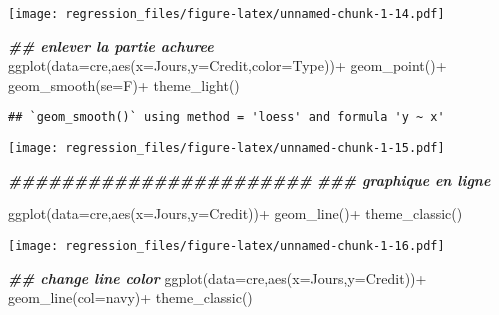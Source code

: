 \documentclass[
]{article}
\newenvironment{Shaded}{\begin{snugshade}}{\end{snugshade}}
\newcommand{\AttributeTok}[1]{\textcolor[rgb]{0.77,0.63,0.00}{#1}}
\newcommand{\DocumentationTok}[1]{\textcolor[rgb]{0.56,0.35,0.01}{\textbf{\textit{#1}}}}
\newcommand{\FunctionTok}[1]{\textcolor[rgb]{0.00,0.00,0.00}{#1}}
\newcommand{\NormalTok}[1]{#1}
\newcommand{\SpecialCharTok}[1]{\textcolor[rgb]{0.00,0.00,0.00}{#1}}
\newcommand{\StringTok}[1]{\textcolor[rgb]{0.31,0.60,0.02}{#1}}
\begin{document}
\texttt{[image: regression\_files/figure-latex/unnamed-chunk-1-14.pdf]}

\begin{Shaded}
\begin{Highlighting}[]
\DocumentationTok{\#\# enlever la partie achuree}
\FunctionTok{ggplot}\NormalTok{(}\AttributeTok{data=}\NormalTok{cre,}\FunctionTok{aes}\NormalTok{(}\AttributeTok{x=}\NormalTok{Jours,}\AttributeTok{y=}\NormalTok{Credit,}\AttributeTok{color=}\NormalTok{Type))}\SpecialCharTok{+}
  \FunctionTok{geom\_point}\NormalTok{()}\SpecialCharTok{+}
  \FunctionTok{geom\_smooth}\NormalTok{(}\AttributeTok{se=}\NormalTok{F)}\SpecialCharTok{+}
  \FunctionTok{theme\_light}\NormalTok{()}
\end{Highlighting}
\end{Shaded}

\begin{verbatim}
## `geom_smooth()` using method = 'loess' and formula 'y ~ x'
\end{verbatim}

\texttt{[image: regression\_files/figure-latex/unnamed-chunk-1-15.pdf]}

\begin{Shaded}
\begin{Highlighting}[]
\DocumentationTok{\#\#\#\#\#\#\#\#\#\#\#\#\#\#\#\#\#\#\#\#\#\#\#}
\DocumentationTok{\#\#\# graphique en ligne}

\FunctionTok{ggplot}\NormalTok{(}\AttributeTok{data=}\NormalTok{cre,}\FunctionTok{aes}\NormalTok{(}\AttributeTok{x=}\NormalTok{Jours,}\AttributeTok{y=}\NormalTok{Credit))}\SpecialCharTok{+}
  \FunctionTok{geom\_line}\NormalTok{()}\SpecialCharTok{+}
  \FunctionTok{theme\_classic}\NormalTok{()}
\end{Highlighting}
\end{Shaded}

\texttt{[image: regression\_files/figure-latex/unnamed-chunk-1-16.pdf]}

\begin{Shaded}
\begin{Highlighting}[]
\DocumentationTok{\#\# change line color}
\FunctionTok{ggplot}\NormalTok{(}\AttributeTok{data=}\NormalTok{cre,}\FunctionTok{aes}\NormalTok{(}\AttributeTok{x=}\NormalTok{Jours,}\AttributeTok{y=}\NormalTok{Credit))}\SpecialCharTok{+}
  \FunctionTok{geom\_line}\NormalTok{(}\AttributeTok{col=}\StringTok{\textquotesingle{}navy\textquotesingle{}}\NormalTok{)}\SpecialCharTok{+}
  \FunctionTok{theme\_classic}\NormalTok{()}
\end{Highlighting}
\end{Shaded}
\end{document}
